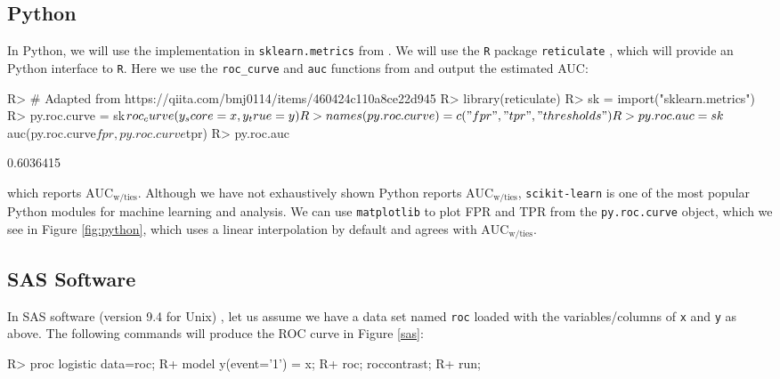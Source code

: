 \documentclass[article]{jss}
\begin{document}
\hypertarget{python}{%
\subsection{Python}\label{python}}

In Python, we will use the implementation in \texttt{sklearn.metrics}
from  \citep{scikitlearn}. We will use the \texttt{R}
package \texttt{reticulate} \citep{reticulate}, which will provide an
Python interface to \texttt{R}. Here we use the \texttt{roc\_curve} and
\texttt{auc} functions from  and output the estimated
AUC:

\begin{CodeChunk}

\begin{CodeInput}
R> # Adapted from https://qiita.com/bmj0114/items/460424c110a8ce22d945
R> library(reticulate)
R> sk = import("sklearn.metrics")
R> py.roc.curve = sk$roc_curve(y_score = x, y_true = y)
R> names(py.roc.curve) = c("fpr", "tpr", "thresholds")
R> py.roc.auc = sk$auc(py.roc.curve$fpr, py.roc.curve$tpr)
R> py.roc.auc
\end{CodeInput}

\begin{CodeOutput}
[1] 0.6036415
\end{CodeOutput}
\end{CodeChunk}

which reports \(\text{AUC}_{\text{w/ties}}\). Although we have not
exhaustively shown Python reports \(\text{AUC}_{\text{w/ties}}\),
\texttt{scikit-learn} is one of the most popular Python modules for
machine learning and analysis. We can use \texttt{matplotlib}
\citep{matplotlib} to plot FPR and TPR from the \texttt{py.roc.curve}
object, which we see in Figure \ref{fig:python}, which uses a linear
interpolation by default and agrees with \(\text{AUC}_{\text{w/ties}}\).

\hypertarget{sas-software}{%
\subsection{SAS Software}\label{sas-software}}

In SAS software (version 9.4 for Unix) \citep{sas}, let us assume we
have a data set named \texttt{roc} loaded with the variables/columns of
\texttt{x} and \texttt{y} as above. The following commands will produce
the ROC curve in Figure \ref{sas}:

\begin{CodeChunk}

\begin{CodeInput}
R>   proc logistic data=roc;
R+       model y(event='1') = x;
R+       roc; roccontrast;
R+       run;      
\end{CodeInput}
\end{CodeChunk}
\end{document}

